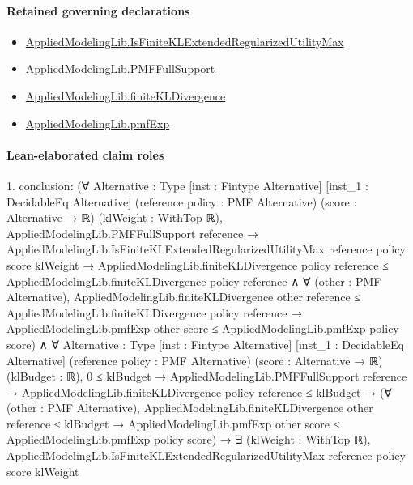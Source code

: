 \documentclass[10pt]{article}
\begin{document}
\paragraph{Retained governing declarations}
\begin{itemize}\raggedright
\item \hyperlink{governing-declaration-603c21f4ad34025c}{Applied\allowbreak{}Modeling\allowbreak{}Lib.\allowbreak{}Is\allowbreak{}Finite\allowbreak{}KL\allowbreak{}Extended\allowbreak{}Regularized\allowbreak{}Utility\allowbreak{}Max}
\item \hyperlink{library-prerequisite-268c959ee7d2d148}{Applied\allowbreak{}Modeling\allowbreak{}Lib.\allowbreak{}PMF\allowbreak{}Full\allowbreak{}Support}
\item \hyperlink{library-prerequisite-d3573881ae45d4c6}{Applied\allowbreak{}Modeling\allowbreak{}Lib.\allowbreak{}finite\allowbreak{}KL\allowbreak{}Divergence}
\item \hyperlink{governing-declaration-8e4b4389a4f6454b}{Applied\allowbreak{}Modeling\allowbreak{}Lib.\allowbreak{}pmf\allowbreak{}Exp}
\end{itemize}
\paragraph{Lean-elaborated claim roles}\begin{ReviewVerbatim}
1. conclusion: (∀ {Alternative : Type} [inst : Fintype Alternative] [inst_1 : DecidableEq Alternative]
    (reference policy : PMF Alternative) (score : Alternative → ℝ) (klWeight : WithTop ℝ),
    AppliedModelingLib.PMFFullSupport reference →
      AppliedModelingLib.IsFiniteKLExtendedRegularizedUtilityMax reference policy score klWeight →
        AppliedModelingLib.finiteKLDivergence policy reference ≤
            AppliedModelingLib.finiteKLDivergence policy reference ∧
          ∀ (other : PMF Alternative),
            AppliedModelingLib.finiteKLDivergence other reference ≤
                AppliedModelingLib.finiteKLDivergence policy reference →
              AppliedModelingLib.pmfExp other score ≤ AppliedModelingLib.pmfExp policy score) ∧
  ∀ {Alternative : Type} [inst : Fintype Alternative] [inst_1 : DecidableEq Alternative]
    (reference policy : PMF Alternative) (score : Alternative → ℝ) (klBudget : ℝ),
    0 ≤ klBudget →
      AppliedModelingLib.PMFFullSupport reference →
        AppliedModelingLib.finiteKLDivergence policy reference ≤ klBudget →
          (∀ (other : PMF Alternative),
              AppliedModelingLib.finiteKLDivergence other reference ≤ klBudget →
                AppliedModelingLib.pmfExp other score ≤ AppliedModelingLib.pmfExp policy score) →
            ∃ (klWeight : WithTop ℝ),
              AppliedModelingLib.IsFiniteKLExtendedRegularizedUtilityMax reference policy score klWeight
\end{ReviewVerbatim}
\end{document}

